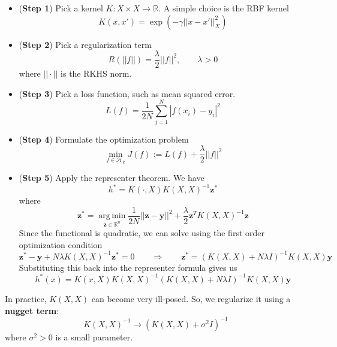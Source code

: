 \documentclass[11pt]{book} %
\begin{document}
\begin{itemize}
    \item (\textbf{Step 1}) Pick a kernel $K: X \times X \rightarrow \mathbb R$. A simple choice is the RBF kernel $$K(x,x') = \exp(-\gamma ||x-x'||_X^2)$$

    \item (\textbf{Step 2}) Pick a regularization term $$R(||f||) = \frac{\lambda}{2} ||f||^2, \qquad \lambda >0$$
    where $||\cdot||$ is the RKHS norm. 

    \item (\textbf{Step 3}) Pick a loss function, such as mean squared error. $$L(f) = \frac{1}{2N} \sum_{j=1}^N |f(x_i)-y_i|^2$$

    \item (\textbf{Step 4}) Formulate the optimization problem $$\min_{f \in \mathcal H_k} J(f) := L(f) + \frac{\lambda}{2} ||f||^2$$

    \item (\textbf{Step 5}) Apply the representer theorem. We have $$h^* = K(\cdot, X) K(X, X)^{-1} \mathbf z^*$$
    where $$\mathbf z^* = \operatorname*{arg\,min}_{\mathbf z \in \mathbb R^n} \frac{1}{2N}||\mathbf z - \mathbf y||^2 + \frac{\lambda}{2} \mathbf z^T K(X,X)^{-1}\mathbf z$$
    Since the functional is quadratic, we can solve using the first order optimization condition $$\mathbf z^* - \mathbf y + N \lambda K(X,X)^{-1}\mathbf z^* = 0 \qquad \Rightarrow \qquad \mathbf z^* = \left( K(X,X) + N\lambda I\right)^{-1} K(X,X) \mathbf y$$
    Substituting this back into the representer formula gives us $$h^*(x) = K(x, X) K(X,X)^{-1}\left(K(X,X) + N\lambda I \right)^{-1} K(X,X) \mathbf y$$
\end{itemize}

In practice, $K(X,X)$ can become very ill-posed. So, we regularize it using a \textbf{nugget term}: $$K(X, X)^{-1}\rightarrow \left(K(X,X) + \sigma^2 I \right)^{-1}$$ where $\sigma^2 >0$ is a small parameter. 
\printbibliography
\end{document}
